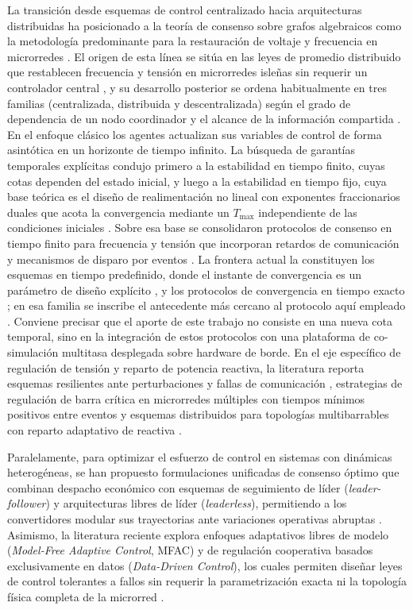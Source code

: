 La transición desde esquemas de control centralizado hacia arquitecturas distribuidas ha posicionado a la teoría de consenso sobre grafos algebraicos como la metodología predominante para la restauración de voltaje y frecuencia en microrredes \citep{Mamun2026, Altin2023MultiAgent}. El origen de esta línea se sitúa en las leyes de promedio distribuido que restablecen frecuencia y tensión en microrredes isleñas sin requerir un controlador central \citep{SimpsonPorco2015}, y su desarrollo posterior se ordena habitualmente en tres familias (centralizada, distribuida y descentralizada) según el grado de dependencia de un nodo coordinador y el alcance de la información compartida \citep{Khayat2020, Li2019}. En el enfoque clásico los agentes actualizan sus variables de control de forma asintótica en un horizonte de tiempo infinito. La búsqueda de garantías temporales explícitas condujo primero a la estabilidad en tiempo finito, cuyas cotas dependen del estado inicial, y luego a la estabilidad en tiempo fijo, cuya base teórica es el diseño de realimentación no lineal con exponentes fraccionarios duales que acota la convergencia mediante un $T_{\max}$ independiente de las condiciones iniciales \citep{Polyakov2012}. Sobre esa base se consolidaron protocolos de consenso en tiempo finito para frecuencia y tensión que incorporan retardos de comunicación \citep{Ning2021} y mecanismos de disparo por eventos \citep{Choi2022}. La frontera actual la constituyen los esquemas en tiempo predefinido, donde el instante de convergencia es un parámetro de diseño explícito \citep{Huang2023}, y los protocolos de convergencia en tiempo exacto \citep{Amrr2026}; en esa familia se inscribe el antecedente más cercano al protocolo aquí empleado \citep{Shrivastava2023FiniteTime}. Conviene precisar que el aporte de este trabajo no consiste en una nueva cota temporal, sino en la integración de estos protocolos con una plataforma de co-simulación multitasa desplegada sobre hardware de borde. En el eje específico de regulación de tensión y reparto de potencia reactiva, la literatura reporta esquemas resilientes ante perturbaciones y fallas de comunicación \citep{Ge2021}, estrategias de regulación de barra crítica en microrredes múltiples con tiempos mínimos positivos entre eventos \citep{Zhai2024} y esquemas distribuidos para topologías multibarrables con reparto adaptativo de reactiva \citep{Huang2026TIE}.

Paralelamente, para optimizar el esfuerzo de control en sistemas con dinámicas heterogéneas, se han propuesto formulaciones unificadas de consenso óptimo que combinan despacho económico con esquemas de seguimiento de líder (\textit{leader-follower}) y arquitecturas libres de líder (\textit{leaderless}), permitiendo a los convertidores modular sus trayectorias ante variaciones operativas abruptas \citep{Guo2026, Salman2024}. Asimismo, la literatura reciente explora enfoques adaptativos libres de modelo (\textit{Model-Free Adaptive Control}, MFAC) y de regulación cooperativa basados exclusivamente en datos (\textit{Data-Driven Control}), los cuales permiten diseñar leyes de control tolerantes a fallos sin requerir la parametrización exacta ni la topología física completa de la microrred \citep{Zhao2025, Xu2025, Ren2024DataDriven}.

